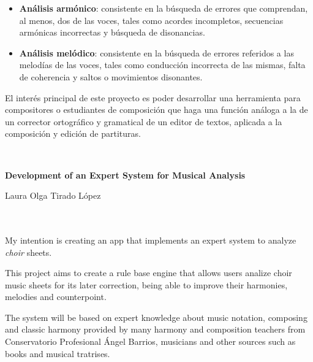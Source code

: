 \documentclass[a4paper, 12pt]{report}
\numberwithin{equation}{section} %
\numberwithin{figure}{section} %
\numberwithin{table}{section} %
\begin{document}
\begin{itemize}
	\item \textbf{Análisis armónico}: consistente en la búsqueda de errores que comprendan, al menos, dos de las voces, tales como acordes incompletos, secuencias armónicas incorrectas y búsqueda de disonancias.
	\item  \textbf{Análisis melódico}: consistente en la búsqueda de errores referidos a las melodías de las voces, tales como conducción incorrecta de las mismas, falta de coherencia y saltos o movimientos disonantes. 
\end{itemize}

\bigskip

El interés principal de este proyecto es poder desarrollar una herramienta para compositores o estudiantes de composición que haga una función análoga a la de un corrector ortográfico y gramatical de un editor de textos, aplicada a la composición y edición de partituras.

\cleardoublepage
\newpage
\thispagestyle{empty}
\

\begin{center}
{\large\bfseries Development of an Expert System for Musical Analysis}\\
\end{center}
\begin{center}
Laura Olga Tirado López\\
\end{center}

\\

\vspace{0.7cm}
\\

My intention is creating an app that implements an expert system to analyze \textit{choir} sheets.

\bigskip

This project aims to create a rule base engine that allows users analize choir music sheets for its later correction, being able to improve their harmonies, melodies and counterpoint.

\bigskip

The system will be based on expert knowledge about music notation, composing and classic harmony provided by many harmony and composition teachers from Conservatorio Profesional Ángel Barrios, musicians and other sources such as books and musical tratrises.
\end{document}
